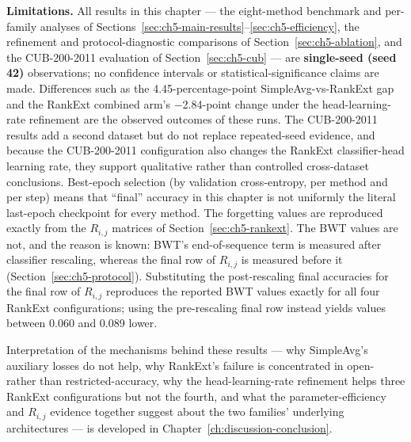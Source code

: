 \textbf{Limitations.} All results in this chapter --- the eight-method
benchmark and per-family analyses of
Sections~\ref{sec:ch5-main-results}--\ref{sec:ch5-efficiency}, the
refinement and protocol-diagnostic comparisons of
Section~\ref{sec:ch5-ablation}, and the CUB-200-2011 evaluation of
Section~\ref{sec:ch5-cub} --- are \textbf{single-seed (seed 42)}
observations; no confidence intervals or statistical-significance claims
are made. Differences such as the 4.45-percentage-point
SimpleAvg-vs-RankExt gap and the RankExt combined arm's $-$2.84-point change
under the head-learning-rate refinement are the observed outcomes of these
runs. The CUB-200-2011 results add a second dataset but do not replace
repeated-seed evidence, and because the CUB-200-2011 configuration also
changes the RankExt classifier-head learning rate, they support qualitative
rather than controlled cross-dataset conclusions.
Best-epoch selection (by validation cross-entropy, per method and per step)
means that ``final'' accuracy in this chapter is not uniformly the literal
last-epoch checkpoint for every method. The forgetting values are
reproduced exactly from the $R_{i,j}$ matrices of
Section~\ref{sec:ch5-rankext}. The BWT values are not, and the reason is
known: BWT's end-of-sequence term is measured after classifier rescaling,
whereas the final row of $R_{i,j}$ is measured before it
(Section~\ref{sec:ch5-protocol}). Substituting the post-rescaling final
accuracies for the final row of $R_{i,j}$ reproduces the reported BWT values
exactly for all four RankExt configurations; using the pre-rescaling final
row instead yields values between 0.060 and 0.089 lower.

Interpretation of the mechanisms behind these results --- why SimpleAvg's
auxiliary losses do not help, why RankExt's failure is concentrated in
open- rather than restricted-accuracy, why the head-learning-rate refinement
helps three RankExt configurations but not the fourth, and what the
parameter-efficiency and $R_{i,j}$ evidence together suggest about the two
families' underlying architectures --- is developed in
Chapter~\ref{ch:discussion-conclusion}.
